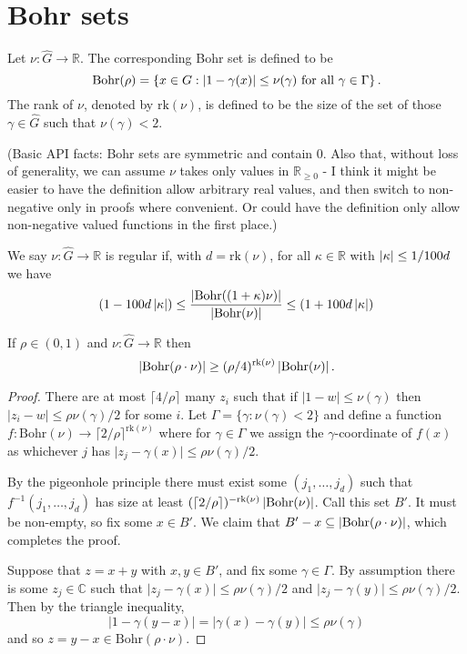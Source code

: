 \chapter{Bohr sets}

\begin{definition}
\label{bohr-set}
Let $\nu: \widehat{G} \to \mathbb{R}$. The corresponding Bohr set is defined to be
\[\mathrm{Bohr}(\rho)=\left\{ x\in G : \left\lvert 1-\gamma(x)\right\rvert\leq \nu(\gamma)\textrm{ for all }\gamma\in\Gamma\right\}.\]
The rank of $\nu$, denoted by $\mathrm{rk}(\nu)$, is defined to be the size of the set of those $\gamma\in\widehat{G}$ such that $\nu(\gamma)<2$.

(Basic API facts: Bohr sets are symmetric and contain $0$. Also that, without loss of generality, we can assume $\nu$ takes only values in $\mathbb{R}_{\geq 0}$ - I think it might be easier to have the definition allow arbitrary real values, and then switch to non-negative only in proofs where convenient. Or could have the definition only allow non-negative valued functions in the first place.)
\end{definition}

\begin{definition}[Regularity]
\label{bohr-reg-def}
We say $\nu:\widehat{G}\to \mathbb{R}$ is regular if, with $d=\mathrm{rk}(\nu)$, for all $\kappa\in\mathbb{R}$ with $\left\lvert \kappa\right\rvert\leq 1/100d$ we have
\[(1-100 d\left\lvert \kappa\right\rvert)\leq \frac{\left\lvert \mathrm{Bohr}((1+\kappa)\nu)\right\rvert}{\left\lvert \mathrm{Bohr}(\nu)\right\rvert}\leq(1+ 100 d\left\lvert \kappa\right\rvert)\]
\end{definition}

\begin{lemma}
\label{bohr-size}
If $\rho\in (0,1)$ and $\nu:\widehat{G}\to \mathbb{R}$ then
\[\left\lvert \mathrm{Bohr}(\rho\cdot \nu)\right\rvert\geq (\rho/4)^{\mathrm{rk}(\nu)}\left\lvert \mathrm{Bohr}(\nu)\right\rvert.\]
\end{lemma}
\begin{proof}
There are at most $\lceil 4/\rho\rceil$ many $z_i$ such that if $\lvert 1-w\rvert \leq \nu(\gamma)$ then $\lvert z_i-w\rvert\leq \rho\nu(\gamma)/2$ for some $i$. Let $\Gamma=\{ \gamma : \nu(\gamma) <2\}$ and define a function $f:\mathrm{Bohr}(\nu)\to \lceil 2/\rho\rceil^{\mathrm{rk}(\nu)}$ where for $\gamma\in \Gamma$ we assign the $\gamma$-coordinate of $f(x)$ as whichever $j$ has $\lvert z_j-\gamma(x)\rvert \leq \rho\nu(\gamma)/2$.

By the pigeonhole principle there must exist some $(j_1,\ldots,j_{d})$ such that $f^{-1}(j_1,\ldots,j_d)$ has size at least $(\lceil 2/\rho\rceil)^{-\mathrm{rk}(\nu)}\left\lvert \mathrm{Bohr}(\nu)\right\rvert$. Call this set $B'$. It must be non-empty, so fix some $x\in B'$. We claim that $B'-x\subseteq \left\lvert \mathrm{Bohr}(\rho\cdot \nu)\right\rvert$, which completes the proof.

Suppose that $z=x+y$ with $x,y\in B'$, and fix some $\gamma\in \Gamma$. By assumption there is some $z_j\in \mathbb{C}$ such that $\lvert z_j-\gamma(x)\rvert \leq \rho \nu(\gamma)/2$ and $\lvert z_j-\gamma(y)\rvert \leq \rho \nu(\gamma)/2$. Then by the triangle inequality,
\[\lvert 1-\gamma(y-x)\rvert=\lvert \gamma(x)-\gamma(y)\rvert \leq \rho \nu(\gamma)\]
and so $z=y-x\in \mathrm{Bohr}(\rho\cdot \nu)$.
\end{proof}

